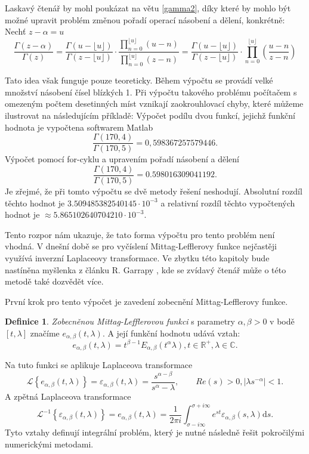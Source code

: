 \documentclass[a4paper,12pt,twoside]{article}
\theoremstyle{definition}
\newtheorem{defin}[veta]{Definice}
\theoremstyle{remark}
\numberwithin{equation}{section}
\numberwithin{table}{section}
\numberwithin{figure}{section}
\newcommand{\dx}[1]{\mathrm{d} #1}
\newcommand{\R}{\mathbb{R}}
\newcommand{\C}{\mathbb{C}}
\begin{document}
Laskavý čtenář by mohl poukázat na větu \ref{gamma2}, díky které by mohlo být možné upravit problém změnou pořadí operací násobení a dělení, konkrétně:
Nechť $z-\alpha = u$
$$\frac{\Gamma\left(z - \alpha\right)}{\Gamma\left(z\right)} = 
\frac{\Gamma\left(u-\lfloor u\rfloor \right)}{\Gamma \left(z - \lfloor u\rfloor \right)} \cdot \frac{\prod_{n=0}^{\lfloor u \rfloor } \left(u-n\right)}{\prod_{n=0}^{\lfloor u\rfloor} \left(z-n\right)}  = 
\frac{\Gamma\left(u-\lfloor u\rfloor \right)}{\Gamma \left(z - \lfloor u\rfloor \right)} \cdot \prod_{n=0}^{\lfloor u \rfloor} \left(\frac{u-n}{z-n}\right)  $$

Tato idea však funguje pouze teoreticky. Během výpočtu se provádí velké množství násobení čísel blízkých 1. Při výpočtu takového problému počítačem s omezeným počtem desetinných míst vznikají zaokrouhlovací chyby, které můžeme ilustrovat na následujícím příkladě:
Výpočet podílu dvou funkcí, jejichž funkční hodnota je vypočtena softwarem Matlab
$$\frac{\Gamma\left(170,4\right)}{\Gamma\left(170,5\right)} = 0,598367257579446.$$
Výpočet pomocí for-cyklu a upravením pořadí násobení a dělení
 $$ \frac{\Gamma\left(170,4\right)}{\Gamma\left(170,5\right)} = 0.598016309041192.$$
 Je zřejmé, že při tomto výpočtu se dvě metody řešení neshodují. Absolutní rozdíl těchto hodnot je $3.509485382540145 \cdot 10^{-3} $ a relativní rozdíl těchto vypočtených hodnot je $\approx 5.865102640704210\cdot 10^{-3}$. 
 
 Tento rozpor nám ukazuje, že tato forma výpočtu pro tento problém není vhodná. V dnešní době se pro vyčíslení Mittag-Lefflerovy funkce nejčastěji využívá inverzní Laplaceovy transformace. Ve zbytku této kapitoly bude nastíněna myšlenka z článku R. Garrapy \cite{Garrappa}, kde se zvídavý čtenář může o této metodě také dozvědět více.

První krok pro tento výpočet je zavedení zobecnění Mittag-Lefflerovy funkce.
\begin{defin}
	\emph{Zobecněnou Mittag-Lefflerovou funkci} s parametry $\alpha, \beta > 0$ v bodě $\left[t,\lambda \right]$ značíme $e_{\alpha, \beta}\left(t,\lambda\right)$. A její funkční hodnotu udává vztah:
	$$e_{\alpha, \beta}\left(t,\lambda\right) = t^{\beta - 1} E_{\alpha,\beta} \left(t^{\alpha}\lambda\right), t \in \R^{+}, \lambda \in \C.$$
\end{defin}
Na tuto funkci se aplikuje Laplaceova transformace
\begin{equation}
	 \mathcal{L}\left\lbrace e_{\alpha, \beta}\left(t,\lambda\right) \right\rbrace = \varepsilon_{\alpha, \beta} \left(t,\lambda \right)  = \frac{s^{\alpha-\beta}}{s^{\alpha} - \lambda}, \qquad Re(s) > 0, |\lambda s^{-\alpha}|<1.
\end{equation}
A zpětná Laplaceova transformace
\begin{equation}
	\mathcal{L}^{-1} \left\lbrace \varepsilon_{\alpha, \beta} \left(t,\lambda \right) \right\rbrace  = e_{\alpha, \beta}\left(t,\lambda\right) = \frac{1}{2\pi i} \int_{\sigma-i \infty}^{\sigma+i \infty} e^{st}\varepsilon_{\alpha, \beta}\left(s,\lambda\right)\dx s.
\end{equation}
Tyto vztahy definují integrální problém, který je nutné následně řešit pokročilými numerickými metodami.
\end{document}

